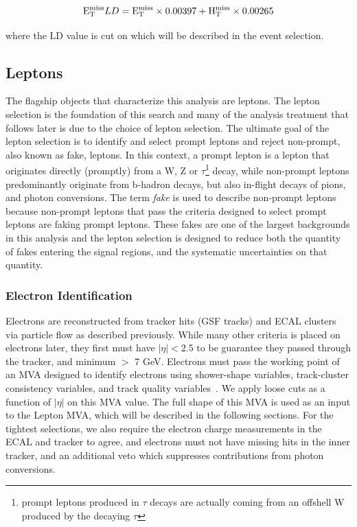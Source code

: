 \begin{equation}
\label{eqn:metld}
 \mathrm{E}^{\mathrm{miss}}_{\mathrm{T}} LD = \mathrm{E}^{\mathrm{miss}}_{\mathrm{T}}\times0.00397 + \mathrm{H}^{\mathrm{miss}}_{\mathrm{T}}\times0.00265
\end{equation}

\noindent where the \met LD value is cut on which will be described in the event selection. 

\subsection{Leptons}
The flagship objects that characterize this analysis are leptons. The lepton selection is the foundation of this \tth search and many of the analysis treatment that follows later is due to the
choice of lepton selection. The ultimate goal of the lepton selection is to identify and select prompt leptons and reject non-prompt, also known as fake, leptons. In this context, a prompt lepton
is a lepton that originates directly (promptly) from a W, Z or $\tau$\footnote{prompt leptons produced in $\tau$ decays are actually coming from an offshell W produced by the decaying $\tau$} decay, while non-prompt leptons
predominantly originate from b-hadron decays, but also in-flight decays of pions, and photon conversions. The term \emph{fake} is used to describe non-prompt leptons because non-prompt leptons
that pass the criteria designed to select prompt leptons are faking prompt leptons. These fakes are one of the largest backgrounds in this analysis and the lepton selection is designed to reduce both
the quantity of fakes entering the signal regions, and the systematic uncertainties on that quantity. 

\subsubsection{Electron Identification}
Electrons are reconstructed from tracker hits (GSF tracks) and ECAL clusters via particle flow as described previously. While many other criteria is placed on electrons later, they first must
have $|\eta|<$2.5 to be guarantee they passed through the tracker, and minimum \pt $>$ 7 GeV. Electrons must pass the working point of an MVA designed to identify electrons using shower-shape variables,
track-cluster consistency variables, and track quality variables~\cite{elemvaid}. We apply loose cuts as a function of $|\eta|$ on this MVA value. The full shape of this MVA is used as an input to
the Lepton MVA, which will be described in the following sections. For the tightest selections, we also require the electron charge measurements in the ECAL and tracker to agree, and electrons must not have
missing hits in the inner tracker, and an additional veto which suppresses contributions from photon conversions. 


